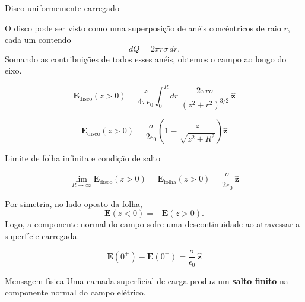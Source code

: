 \documentclass[aspectratio=169,11pt]{beamer}
\newcommand{\E}{\mathbf{E}}
\newcommand{\zhat}{\hat{\mathbf{z}}}
\begin{document}
\begin{frame}{Disco uniformemente carregado}
\begin{mybox}
\justifying
O disco pode ser visto como uma superposição de anéis concêntricos de raio \(r\), cada um contendo
\[
dQ=2\pi r \sigma\,dr.
\]
Somando as contribuições de todos esses anéis, obtemos o campo ao longo do eixo.
\end{mybox}

\vspace{0.2cm}

\begin{eqbox}
\begin{equation}
\E_{\text{disco}}(z>0)=
\frac{z}{4\pi\epsilon_0}
\int_{0}^{R}dr\;
\frac{2\pi r\sigma}{(z^2+r^2)^{3/2}}\,\zhat
\label{eq:3.10c}
\end{equation}
\end{eqbox}

\vspace{0.15cm}

\begin{eqbox}
\begin{equation}
\E_{\text{disco}}(z>0)=
\frac{\sigma}{2\epsilon_0}
\left(
1-\frac{z}{\sqrt{z^2+R^2}}
\right)\zhat
\label{eq:3.10d}
\end{equation}
\end{eqbox}
\end{frame}

\begin{frame}{Limite de folha infinita e condição de salto}
\begin{eqbox}
\begin{equation}
\lim_{R\to\infty}\E_{\text{disco}}(z>0)
=
\E_{\text{folha}}(z>0)
=
\frac{\sigma}{2\epsilon_0}\,\zhat
\label{eq:3.10e}
\end{equation}
\end{eqbox}

\vspace{0.2cm}

\begin{mybox}
\justifying
Por simetria, no lado oposto da folha,
\[
\E(z<0)=-\E(z>0).
\]
Logo, a componente normal do campo sofre uma descontinuidade ao atravessar a superfície carregada.
\end{mybox}

\vspace{0.15cm}

\begin{eqbox}
\begin{equation}
\E(0^+)-\E(0^-)=\frac{\sigma}{\epsilon_0}\,\zhat
\label{eq:3.10f}
\end{equation}
\end{eqbox}

\vspace{0.15cm}

\begin{alertblock}{Mensagem física}
Uma camada superficial de carga produz um \textbf{salto finito} na componente normal do campo elétrico.
\end{alertblock}
\end{frame}
\end{document}
